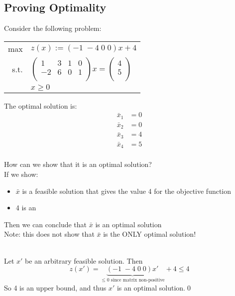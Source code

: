 \documentclass[letterpaper, 12pt]{article}
\newcommand{\red}[1]{{\color{red}{#1}}}
\begin{document}
    \subsection{Proving Optimality}
    Consider the following problem:\\
    \begin{center}
        \begin{tabular}{rl}
            max & $z(x) := (-1 \; -4 \; 0 \; 0)x + 4$\\
            s.t. & $\begin{pmatrix}
                1 & 3 & 1 & 0\\
                -2 & 6 & 0 & 1\\
            \end{pmatrix} x = \begin{pmatrix}
                4\\
                5\\
            \end{pmatrix}$\\
            & $x \geq 0$\\
        \end{tabular}
    \end{center}

    The optimal solution is:\\
    \begin{align*}
        \bar{x}_1 &= 0\\
        \bar{x}_2 &= 0\\
        \bar{x}_3 &= 4\\
        \bar{x}_4 &= 5\\
    \end{align*}

    How can we show that it is an optimal solution?\\
    If we show:\\
    \begin{itemize}
        \item $\bar{x}$ is a feasible solution that gives the value 4 for the objective function
        \item 4 is an \red{upper bound}
    \end{itemize}
    Then we can conclude that $\bar{x}$ is an optimal solution\\
    Note: this does not show that $\bar{x}$ is the ONLY optimal solution!\\
    \pagebreak

    \red{\textbf{Proof:}}\\
    Let $x'$ be an arbitrary feasible solution. Then\\
    $$z(x') = \underbrace{(-1 \; -4 \; 0 \; 0)x'}_{\leq 0 \text{ since matrix non-positive}} + 4 \leq 4$$
    So 4 is an upper bound, and thus $x'$ is an optimal solution.\qed
\end{document}
